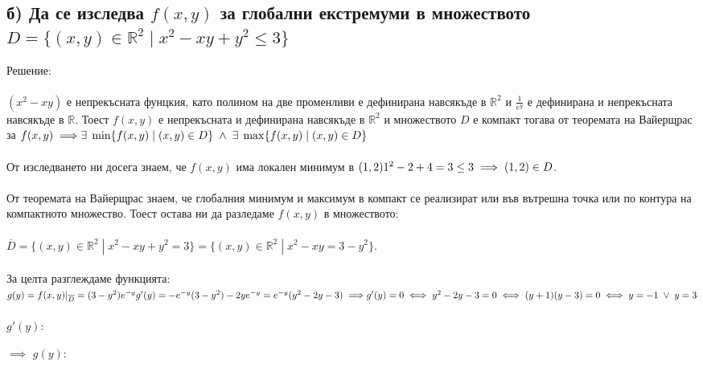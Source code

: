 \documentclass[14pt]{extarticle}
\newcommand{\R}{\mathbb{R}}
\begin{document}
\subsection{б) Да се изследва \(f(x, y)\) за глобални екстремуми в множеството \(D = \{(x, y) \in \R^2 \; | \; x^2 -xy + y^2 \leq 3\}\) }
Решение: \\\\
\((x^2 - xy)\) е непрекъсната фунцкия, като полином на две променливи е дефинирана навсякъде в \(\R^2\) и
\(\frac{1}{e^y}\) е дефинирана и непрекъсната навсякъде в \(\R\). Тоест \(f(x, y)\) е непрекъсната и дефинирана навсякъде в \(\R^2\) и множеството \(D\)
е компакт тогава от теоремата на Вайерщрас за \(f(x,y) \implies \\\\
\exists \; \min\{f(x, y) \; | \; (x, y) \in D\} \; \wedge \; \exists \; \max\{f(x, y) \; | \; (x, y) \in D\}\) \\\\
От изследването ни досега знаем, че \(f(x, y)\) има локален минимум в \((1, 2) \\\\
1^2 - 2 + 4 = 3 \leq 3 \implies (1, 2) \in D\).  \\\\
От теоремата на Вайерщрас знаем, че глобалния минимум и максимум в компакт се реализират или във вътрешна точка или по контура на компактното множество.
Тоест остава ни да разледаме \(f(x, y)\) в множеството: \\\\
\(\overline{D} = \{(x, y) \in \R^2 \; | \; x^2 -xy + y^2 = 3\} = \{(x, y) \in \R^2 \; | \; x^2 -xy = 3 - y^2\}\). \\\\
За целта разглеждаме функцията: \(g(y) = f(x, y)|_{\overline{D}} = (3 - y^2)e^{-y} \\\\
g'(y) = -e^{-y}(3 - y^2) - 2ye^{-y} = e^{-y}(y^2 - 2y - 3) \implies \\\\
g'(y) = 0 \iff y^2 - 2y - 3 = 0 \iff (y + 1) (y - 3) = 0 \iff y = - 1 \; \vee \; y = 3 \) \\\\
\(g'(y)\):  \(\implies\) \(g(y)\):  \\\\\\
\end{document}
